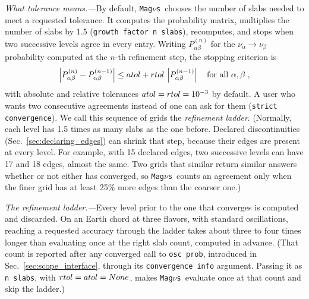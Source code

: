 \documentclass[final,5p,times,twocolumn,sort,compress]{elsarticle}
\makeatletter
\DeclareRobustCommand{\_}{%
  \ifmmode\nfss@text{\textunderscore}\else\textunderscore\allowbreak\fi}
\newcommand{\magnus}{{\tt Mag}\ensuremath{\nu}{\tt s}}
\makeatother
\begin{document}
\textit{What tolerance means.---}By default, \magnus\ chooses the number of slabs needed to meet a requested tolerance. It computes the probability matrix, multiplies the number of slabs by $1.5$ ({\tt growth\_factor\_n\_slabs}), recomputes, and stops when two successive levels agree in every entry. Writing $P^{(n)}_{\alpha\beta}$ for the $\nu_\alpha \to \nu_\beta$ probability computed at the $n$-th refinement step, the stopping criterion is
\begin{equation}
 \label{equ:refinement_stop}
 \left\lvert P^{(n)}_{\alpha\beta} - P^{(n-1)}_{\alpha\beta} \right\rvert
 \leq
 {\tt atol} + {\tt rtol}\, \left\lvert P^{(n-1)}_{\alpha\beta} \right\rvert
 \quad \text{for all } \alpha, \beta \;,
\end{equation}
with absolute and relative tolerances ${\tt atol} = {\tt rtol} = 10^{-3}$ by default. A user who wants two consecutive agreements instead of one can ask for them ({\tt strict\_convergence}). We call this sequence of grids the \emph{refinement ladder}. (Normally, each level has 1.5 times as many slabs as the one before. Declared discontinuities (Sec.~\ref{sec:declaring_edges}) can shrink that step, because their edges are present at every level. For example, with 15 declared edges, two successive levels can have 17 and 18 edges, almost the same. Two grids that similar return similar answers whether or not either has converged, so \magnus\ counts an agreement only when the finer grid has at least 25\% more edges than the coarser one.)

\smallskip

\textit{The refinement ladder.---}Every level prior to the one that converges is computed and discarded. On an Earth chord at three flavors, with standard oscillations, reaching a requested accuracy through the ladder takes about three to four times longer than evaluating once at the right slab count, computed in advance. (That count is reported after any converged call to {\tt osc\_prob}, introduced in Sec.~\ref{sec:scope_interface}, through its {\tt convergence\_info} argument. Passing it as {\tt n\_slabs}, with ${\tt rtol} = {\tt atol} = {\tt None}$, makes \magnus\ evaluate once at that count and skip the ladder.)
\end{document}
